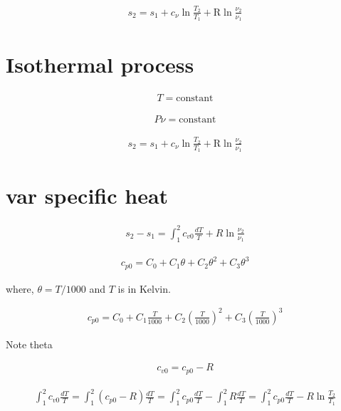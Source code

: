 \documentclass{article}
\begin{document}
	\begin{align*}
		s_2 = s_1 + c_\nu \ln\frac{T_2}{T_1} + \text{R}\ln\frac{\nu_2}{\nu_1}
	\end{align*}

	\section{Isothermal process}

	\begin{align*}
		T = \text{constant}
	\end{align*}

	\begin{align*}
		P\nu = \text{constant}
	\end{align*}

	\begin{align*}
		s_2 = s_1 + c_\nu \ln\frac{T_2}{T_1} + \text{R}\ln\frac{\nu_2}{\nu_1}
	\end{align*}




	\section{var specific heat}

	\begin{align*}
		s_2 - s_1 = \int_1^2 c_{v0}\frac{dT}{T} + R\ln\frac{\nu_2}{\nu_1}
	\end{align*}

	\begin{align*}
		c_{p0} = C_0 + C_1\theta + C_2\theta^2 + C_3\theta^3
	\end{align*}

	where, $\theta=T/1000$ and $T$ is in Kelvin.

	\begin{align*}
		c_{p0} = C_0 + C_1\frac{T}{1000} + C_2\left(\frac{T}{1000}\right)^2 + C_3\left(\frac{T}{1000}\right)^3
	\end{align*}

	Note theta
	
	\begin{align*}
		c_{v0} = c_{p0} - R
	\end{align*}

	\begin{align*}
		\int_1^2 c_{v0}\frac{dT}{T}
		=
		\int_1^2 (c_{p0} - R)\frac{dT}{T}
		=
		\int_1^2 c_{p0}\frac{dT}{T} - \int_1^2 R\frac{dT}{T}
		=
		\int_1^2 c_{p0}\frac{dT}{T} - R\ln\frac{T_2}{T_1}
	\end{align*}
\end{document}

